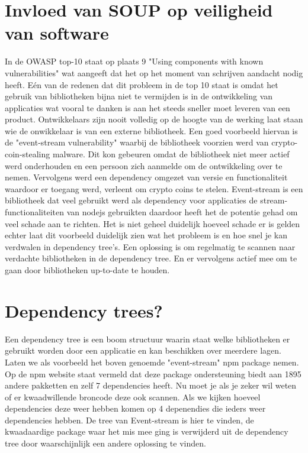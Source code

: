 \section{Invloed van SOUP op veiligheid van software}\label{sec:invloed-van-soup-op-veiligheid-van-software}
In de OWASP top-10 staat op plaats 9 "Using components with known vulnerabilities" wat aangeeft dat het op het moment van schrijven aandacht nodig heeft.
Eén van de redenen dat dit probleem in de top 10 staat is omdat het gebruik van bibliotheken bijna niet te vermijden is in de ontwikkeling van applicaties wat vooral te danken is aan het steeds sneller moet leveren van een product.
Ontwikkelaars zijn nooit volledig op de hoogte van de werking laat staan wie de onwikkelaar is van een externe bibliotheek.
Een goed voorbeeld hiervan is de "event-stream vulnerability" waarbij de bibliotheek voorzien werd van crypto-coin-stealing malware.
Dit kon gebeuren omdat de bibliotheek niet meer actief werd onderhouden en een persoon zich aanmelde om de ontwikkeling over te nemen.
Vervolgens werd een dependency omgezet van versie en functionaliteit waardoor er toegang werd, verleent om crypto coins te stelen.
Event-stream is een bibliotheek dat veel gebruikt werd als dependency voor applicaties de stream-functionaliteiten van nodejs gebruikten daardoor heeft het de potentie gehad om veel schade aan te richten.
Het is niet geheel duidelijk hoeveel schade er is gelden echter laat dit voorbeeld duidelijk zien wat het probleem is en hoe snel je kan verdwalen in dependency tree's.
Een oplossing is om regelmatig te scannen naar verdachte bibliotheken in de dependency tree.
En er vervolgens actief mee om te gaan door bibliotheken up-to-date te houden.

\section{Dependency trees?}\label{sec:dependency-trees?}
Een dependency tree is een boom structuur waarin staat welke bibliotheken er gebruikt worden door een applicatie en kan beschikken over meerdere lagen.
Laten we als voorbeeld het boven genoemde "event-stream" npm package nemen.
Op de npm website staat vermeld dat deze package ondersteuning biedt aan 1895 andere pakketten en zelf 7 dependencies heeft.
Nu moet je als je zeker wil weten of er kwaadwillende broncode deze ook scannen.
Als we kijken hoeveel dependencies deze weer hebben komen op 4 depenendies die ieders weer dependencies hebben.
De tree van Event-stream is hier te vinden, de kwaadaardige package waar het mis mee ging is verwijderd uit de dependency tree door waarschijnlijk een andere oplossing te vinden.

